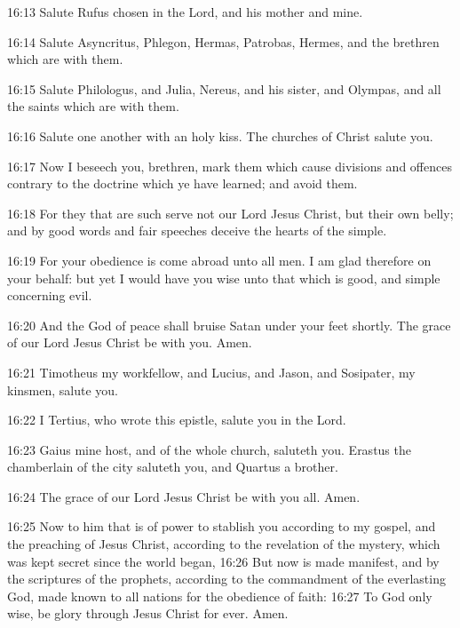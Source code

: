 16:13 Salute Rufus chosen in the Lord, and his mother and mine.

16:14 Salute Asyncritus, Phlegon, Hermas, Patrobas, Hermes, and the
brethren which are with them.

16:15 Salute Philologus, and Julia, Nereus, and his sister, and
Olympas, and all the saints which are with them.

16:16 Salute one another with an holy kiss. The churches of Christ
salute you.

16:17 Now I beseech you, brethren, mark them which cause divisions and
offences contrary to the doctrine which ye have learned; and avoid
them.

16:18 For they that are such serve not our Lord Jesus Christ, but
their own belly; and by good words and fair speeches deceive the
hearts of the simple.

16:19 For your obedience is come abroad unto all men. I am glad
therefore on your behalf: but yet I would have you wise unto that
which is good, and simple concerning evil.

16:20 And the God of peace shall bruise Satan under your feet shortly.
The grace of our Lord Jesus Christ be with you. Amen.

16:21 Timotheus my workfellow, and Lucius, and Jason, and Sosipater,
my kinsmen, salute you.

16:22 I Tertius, who wrote this epistle, salute you in the Lord.

16:23 Gaius mine host, and of the whole church, saluteth you. Erastus
the chamberlain of the city saluteth you, and Quartus a brother.

16:24 The grace of our Lord Jesus Christ be with you all. Amen.

16:25 Now to him that is of power to stablish you according to my
gospel, and the preaching of Jesus Christ, according to the revelation
of the mystery, which was kept secret since the world began, 16:26 But
now is made manifest, and by the scriptures of the prophets, according
to the commandment of the everlasting God, made known to all nations
for the obedience of faith: 16:27 To God only wise, be glory through
Jesus Christ for ever. Amen.

